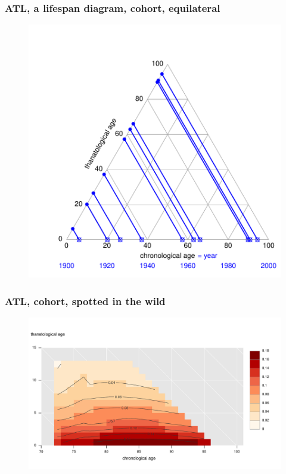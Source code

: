 \documentclass[20pt]{beamer}
\begin{document}
\begin{frame}
\frametitle{ATL, a lifespan diagram, cohort, equilateral}
\begin{figure}[b]
    \centering
    \includegraphics{Figures/LabPres/ATL6.pdf}
\end{figure} 
\end{frame}

\begin{frame}
\frametitle{ATL, cohort, spotted in the wild}
\begin{figure}[b]
    \centering
    \includegraphics[scale=.9]{Figures/LabPres/ATL_Surf_Male_psych_HRS.pdf}
\end{figure} 
\end{frame}
\end{document}
